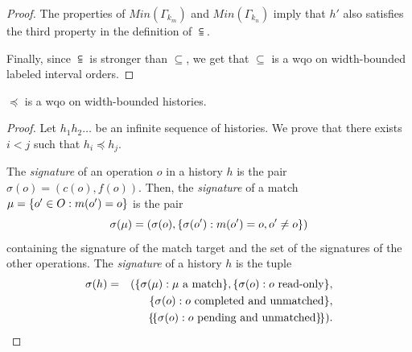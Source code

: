 \begin{proof}
The properties of $Min(\Gamma_{k_m})$ and $Min(\Gamma_{k_n})$ imply that $h'$ also satisfies the third property in the definition of $\subseteqq$.

Finally, since $\subseteqq$ is stronger than $\subseteq$, we get that $\subseteq$ is a wqo on width-bounded labeled interval orders.
\end{proof} 

\begin{lemma}

  $\preceq$ is a wqo on width-bounded histories.

\end{lemma}

\begin{proof}

%
%

Let $h_1 h_2\ldots $ be an infinite sequence of histories. We prove that there exists $i<j$ such that $h_i\preceq h_j$.

The \emph{signature} of an operation $o$ in a history $h$ is the pair $\sigma(o)=(c(o),f(o))$.
Then, the \emph{signature} of a match $\mu={\{{ o' \in O : m(o') = o}\}}$ is the pair 
\[
\sigma(\mu)=(\sigma(o),{\{{\sigma(o') : m(o')=o, o'\neq o}\}})
\]
containing the signature of the match target and the set of the signatures of the other operations.
The \emph{signature} of a history $h$ is the tuple 
\begin{align*}
\sigma(h)&=&({\{{\sigma(\mu): \mu\mbox{ a match}}\}}, {\{{\sigma(o): o\mbox{ read-only}}\}}, \\
&& {\{{\sigma(o): o\mbox{ completed and unmatched}}\}}, \\
&& {\{\!\{ \sigma(o): o\mbox{ pending and unmatched} \}\!\}}).
\end{align*}


\end{proof}

